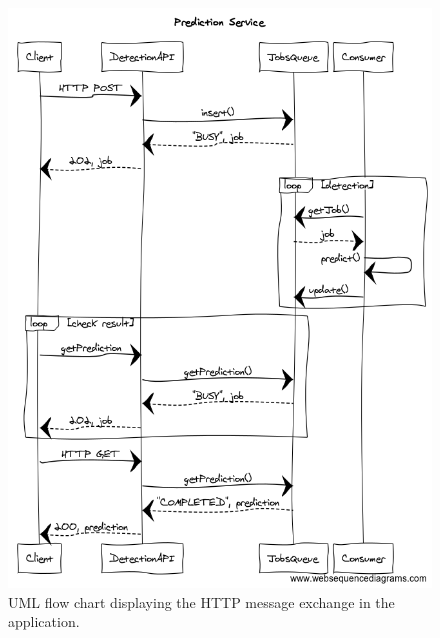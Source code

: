 \begin{figure}[htbp]
\begin{center}
\includegraphics[width=\textwidth]{immagini/pictures/flow.png} 
\caption{UML flow chart displaying the HTTP message exchange in the application.}
\end{center}
\end{figure}


